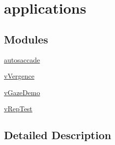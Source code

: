 \hypertarget{group__applications}{}\section{applications}
\label{group__applications}
\subsection*{Modules}
\begin{DoxyCompactItemize}
\item 
\hyperlink{group__autosaccade}{autosaccade}
\item 
\hyperlink{group__vVergence}{v\+Vergence}
\item 
\hyperlink{group__vGazeDemo}{v\+Gaze\+Demo}
\item 
\hyperlink{group__vRepTest}{v\+Rep\+Test}
\end{DoxyCompactItemize}


\subsection{Detailed Description}
